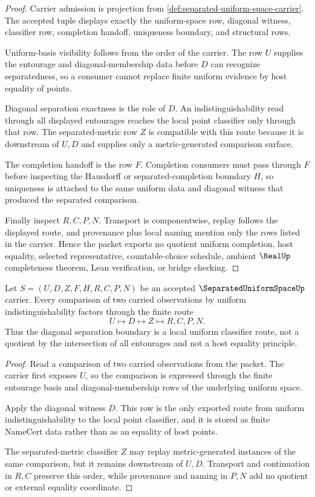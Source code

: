 \begin{proof}
Carrier admission is projection from \autoref{def:separated-uniform-space-carrier}. The accepted tuple displays exactly the uniform-space row, diagonal witness, classifier row, completion handoff, uniqueness boundary, and structural rows.

Uniform-basis visibility follows from the order of the carrier. The row $U$ supplies the entourage and diagonal-membership data before $D$ can recognize separatedness, so a consumer cannot replace finite uniform evidence by host equality of points.

Diagonal separation exactness is the role of $D$. An indistinguishability read through all displayed entourages reaches the local point classifier only through that row. The separated-metric row $Z$ is compatible with this route because it is downstream of $U,D$ and supplies only a metric-generated comparison surface.

The completion handoff is the row $F$. Completion consumers must pass through $F$ before inspecting the Hausdorff or separated-completion boundary $H$, so uniqueness is attached to the same uniform data and diagonal witness that produced the separated comparison.

Finally inspect $R,C,P,N$. Transport is componentwise, replay follows the displayed route, and provenance plus local naming mention only the rows listed in the carrier. Hence the packet exports no quotient uniform completion, host equality, selected representative, countable-choice schedule, ambient $\RealUp$ completeness theorem, Lean verification, or bridge checking.
\end{proof}

\begin{theorem}
\label{thm:separated-uniform-space-diagonal-uniformity-boundary}
Let $S=(U,D,Z,F,H,R,C,P,N)$ be an accepted $\SeparatedUniformSpaceUp$ carrier. Every comparison of two carried observations by uniform indistinguishability factors through the finite route
$$
U\longmapsto D\longmapsto Z\longmapsto R,C,P,N .
$$
Thus the diagonal separation boundary is a local uniform classifier route, not a quotient by the intersection of all entourages and not a host equality principle.
\end{theorem}
\begin{proof}
Read a comparison of two carried observations from the packet. The carrier first exposes $U$, so the comparison is expressed through the finite entourage basis and diagonal-membership rows of the underlying uniform space.

Apply the diagonal witness $D$. This row is the only exported route from uniform indistinguishability to the local point classifier, and it is stored as finite NameCert data rather than as an equality of host points.

The separated-metric classifier $Z$ may replay metric-generated instances of the same comparison, but it remains downstream of $U,D$. Transport and continuation in $R,C$ preserve this order, while provenance and naming in $P,N$ add no quotient or external equality coordinate.
\end{proof}

